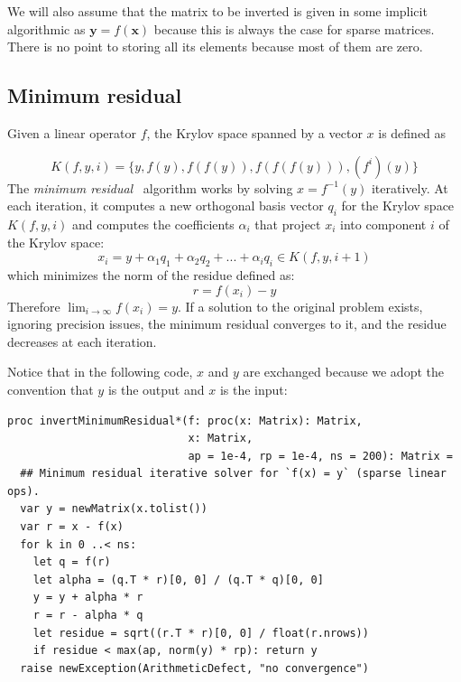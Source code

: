 \documentclass[justified, sixbynine]{tufte-book}
\def\ft{\small\tt}
\theoremstyle{plain}%
\newtheorem * {corollary}{Corollary}
\theoremstyle{definition}
\theoremstyle{remark}
\newtheorem * {remark}{Remark}
\newtheorem * {note}{Note}
\begin{document}
\begin{fullwidth}
We will also assume that the matrix to be inverted is given in some implicit algorithmic as $\mathbf{y}=f(\mathbf{x})$ because this is always the case for sparse matrices. There is no point to storing all its elements because most of them are zero.


\goodbreak\subsection{Minimum residual}


Given a linear operator $f$, the Krylov space spanned by a vector $x$ is defined as

\begin{equation}
K(f, y, i) = \{y, f(y), f(f(y)), f(f(f(y))), (f^i)(y)\}
\end{equation}
The {\it minimum residual}~\cite{minres} algorithm works by solving $x=f^{-1}(y)$ iteratively. At each iteration, it computes a new orthogonal basis vector $q_i$ for the Krylov space $K(f, y, i)$ and computes the coefficients $\alpha_i$ that project $x_i$ into component $i$ of the Krylov space:
\begin{equation}
x_i = y + \alpha_1 q_1 + \alpha_2 q_2 + ... + \alpha_i q_i \in K(f, y, i+1)
\end{equation}
which minimizes the norm of the residue defined as:
\begin{equation}
r = f(x_i) - y
\end{equation}
Therefore $\lim_{i\rightarrow\infty} f(x_i) = y$.
If a solution to the original problem exists, ignoring precision issues, the minimum residual converges to it, and the residue decreases at each iteration.

Notice that in the following code, $x$ and $y$ are exchanged because we adopt the convention that $y$ is the output and $x$ is the input:

\begin{lstlisting}[caption={in file: {\ft nlib.nim}}]
proc invertMinimumResidual*(f: proc(x: Matrix): Matrix,
                            x: Matrix,
                            ap = 1e-4, rp = 1e-4, ns = 200): Matrix =
  ## Minimum residual iterative solver for `f(x) = y` (sparse linear ops).
  var y = newMatrix(x.tolist())
  var r = x - f(x)
  for k in 0 ..< ns:
    let q = f(r)
    let alpha = (q.T * r)[0, 0] / (q.T * q)[0, 0]
    y = y + alpha * r
    r = r - alpha * q
    let residue = sqrt((r.T * r)[0, 0] / float(r.nrows))
    if residue < max(ap, norm(y) * rp): return y
  raise newException(ArithmeticDefect, "no convergence")
\end{lstlisting}


\end{fullwidth}
\end{document}
